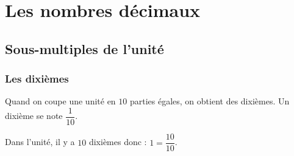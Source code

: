 \documentclass[a4paper,10pt]{report}
\begin{document}
\setcounter{chapter}{6}
\chapter{Les nombres décimaux}

\section{Sous-multiples de l'unité}

\subsection{Les dixièmes}

\begin{defn}
Quand on coupe une unité en $10$ parties égales, on obtient des dixièmes. Un dixième se note $\dfrac{1}{10}$. 

\noindent Dans l'unité, il y a $10$ dixièmes donc : $1=\dfrac{10}{10}$.
\end{defn}
\end{document}
